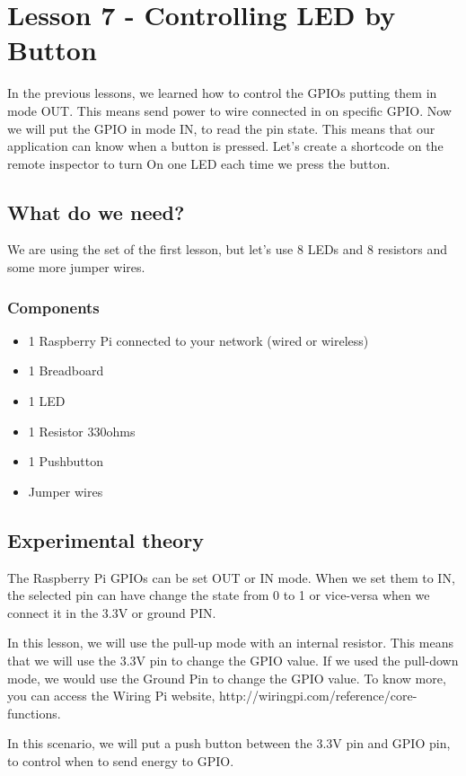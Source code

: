 \documentclass[10pt,twoside,english]{_support/latex/sbabook/sbabook}
\begin{document}
\frontmatter
\pagestyle{plain}

\tableofcontents*
\clearpage\listoffigures

\mainmatter

\chapter{Lesson 7 - Controlling LED by Button}
In the previous lessons, we learned how to control the GPIOs putting them in mode OUT. This means send power to wire connected in on specific GPIO. Now we will put the GPIO in mode IN, to read the pin state. This means that our application can know when a button is pressed. Let’s create a shortcode on the remote inspector to turn On one LED each time we press the button.
\section{What do we need?}
We are using the set of the first lesson, but let's use 8 LEDs and 8 resistors and some more jumper wires.
\subsection{Components}
\begin{itemize}
\item 1 Raspberry Pi connected to your network (wired or wireless)
\item 1 Breadboard
\item 1 LED
\item 1 Resistor 330ohms
\item 1 Pushbutton
\item Jumper wires
\end{itemize}
\section{Experimental theory}
The Raspberry Pi GPIOs can be set OUT or IN mode. When we set them to IN, the selected pin can have change the state from 0 to 1 or vice-versa when we connect it in the 3.3V or ground PIN.

In this lesson, we will use the pull-up mode with an internal resistor. This means that we will use the 3.3V pin to change the GPIO value. If we used the pull-down mode, we would use the Ground Pin to change the GPIO value. To know more, you can access the Wiring Pi website, http://wiringpi.com/reference/core-functions.

In this scenario, we will put a push button between the 3.3V pin and GPIO pin, to control when to send energy to GPIO.
\end{document}
